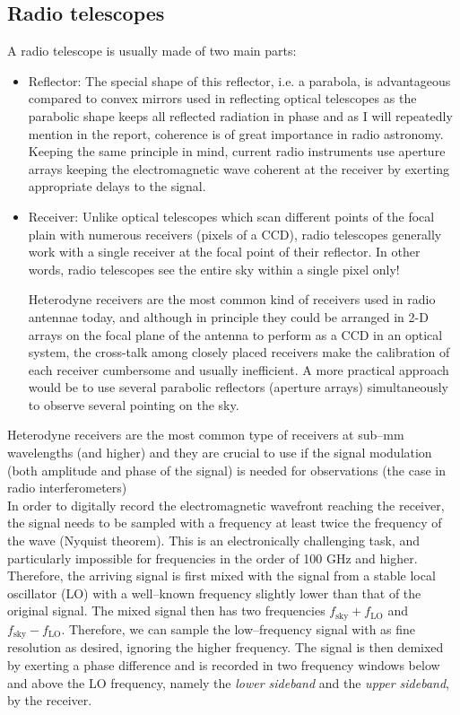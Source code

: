 \documentclass[paper=a4, fontsize=11pt]{scrartcl} %
\numberwithin{equation}{section} %
\numberwithin{figure}{section} %
\numberwithin{table}{section} %
\begin{document}
\subsection{Radio telescopes}
A radio telescope is usually made of two main parts:
\begin{itemize}
\item Reflector: The special shape of this reflector, i.e. a parabola, is advantageous compared to convex mirrors used in reflecting optical telescopes as the parabolic shape keeps all reflected radiation  in phase and as I will repeatedly mention in the report, coherence is of great importance in radio astronomy. Keeping the same principle in mind, current radio instruments use aperture arrays keeping the electromagnetic wave coherent at the receiver by exerting appropriate delays to the signal.
\item Receiver: Unlike optical telescopes which scan different points of the focal plain with numerous receivers (pixels of a CCD), radio telescopes generally work with a single receiver at the focal point of their reflector. In other words, radio telescopes see the entire sky within a single pixel only!

Heterodyne receivers are the most common kind of receivers used in radio antennae today, and although in principle they could be arranged in 2-D arrays on the focal plane of the antenna to perform as a CCD in an optical system, the cross-talk among closely placed receivers make the calibration of each receiver cumbersome and usually inefficient. A more practical approach would be to use several parabolic reflectors (aperture arrays) simultaneously to observe several pointing on the sky.
\end{itemize}
Heterodyne receivers are the most common type of receivers at sub--mm wavelengths (and higher) and they are crucial to use if the signal modulation (both amplitude and phase of the signal) is needed for observations (the case in radio interferometers)\\

In order to digitally record the electromagnetic wavefront reaching the receiver, the signal needs to be sampled with a frequency at least twice the frequency of the wave (Nyquist theorem). This is an electronically challenging task, and particularly impossible for frequencies in the order of 100 GHz and higher. Therefore, the arriving signal is first mixed with the signal from a stable local oscillator (LO) with a well--known frequency slightly lower than that of the original signal. The mixed signal then has two frequencies $f_\mathrm{sky} + f_\mathrm{LO}$ and $f_\mathrm{sky} - f_\mathrm{LO}$. Therefore, we can sample the low--frequency signal with as fine resolution as desired, ignoring the higher frequency. The signal is then demixed by exerting a phase difference and is recorded in two frequency windows below and above the LO frequency, namely the \emph{lower sideband} and the \emph{upper sideband}, by the receiver.
\end{document}
